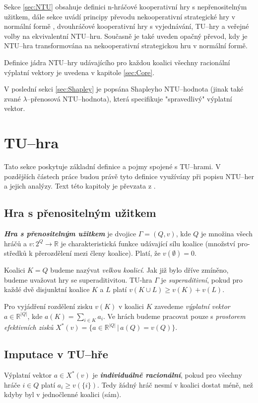     Sekce \ref{sec:NTU} obsahuje definici n-hráčové kooperativní hry s nepřenositelným užitkem, dále sekce uvádí principy převodu nekooperativní strategické hry v normální formě \cite{Hruby2022NCOOP}, dvouhráčové kooperativní hry s vyjednávání, TU--hry a veřejné volby na ekvivalentní NTU--hru. Současně je také uveden opačný převod, kdy je NTU--hra transformována na nekooperativní strategickou hru v normální formě.

    Definice jádra NTU--hry udávajícího pro každou koalici všechny racionální výplatní vektory je uvedena v kapitole \ref{sec:Core}.

    V poslední sekci \ref{sec:Shapley} je popsána Shapleyho NTU--hodnota (jinak také zvané $\lambda$--přenosová NTU--hodnota), která specifikuje "spravedlivý" výplatní vektor.


\section{TU--hra}
    \label{sec:TU}
    Tato sekce poskytuje základní definice a pojmy spojené s TU--hrami. V pozdějších částech práce budou právě tyto definice využívány při popisu NTU--her a jejich analýzy. Text této kapitoly je převzata z \cite{Hruby2022}.

    \subsection{Hra s přenositelným užitkem}
        \textit{\textbf{Hra s přenositelným užitkem}} je dvojice $\Gamma = (Q, v)$, kde $Q$ je množina všech hráčů a $v: 2^Q \rightarrow \mathbb{R}$ je charakteristická funkce udávající sílu koalice (množství pro-středků k přerozdělení mezi členy koalice). Platí, že $v(\emptyset) = 0$.

        Koalici $K = Q$ budeme nazývat \textit{velkou koalicí}. Jak již bylo dříve zmíněno, budeme uvažovat hry se superaditivitou. TU-hra $\Gamma$ je \textit{superaditivní}, pokud pro každé dvě disjunktní koalice $K$ a $L$ platí $v(K \cup L) \geq v(K) + v(L)$.

        Pro vyjádření rozdělení zisku $v(K)$ v koalici $K$ zavedeme \textit{výplatní vektor} $a \in \mathbb{R}^{|Q|}$, kde $a(K) = \sum_{i\in K}a_i$. Ve hrách budeme pracovat pouze s \textit{prostorem efektivních zisků} $X^*(v) = \{a \in \mathbb{R}^{|Q|}\,|\,a(Q) = v(Q)\}$.

    \subsection{Imputace v TU--hře}
        Výplatní vektor $a \in X^*(v)$ je \textit{\textbf{individuálně racionální}}, pokud pro všechny hráče $i \in Q$ platí $a_i \geq v(\{i\})$. Tedy žádný hráč nesmí v koalici dostat méně, než kdyby byl v jednočlenné koalici (sám).

